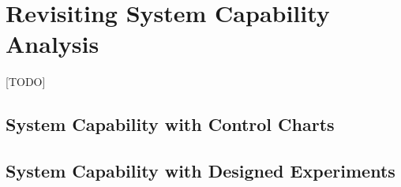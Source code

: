 \documentclass[12pt,a4paper]{report}
\begin{document}









\chapter{Revisiting System Capability Analysis}
\label{sec:advanced_capability_analysis}
[TODO]
\section{System Capability with Control Charts}
\section{System Capability with Designed Experiments}




\newpage

\appendix







\newpage
{}


%
\label{sec:bibliography}
\end{document}

